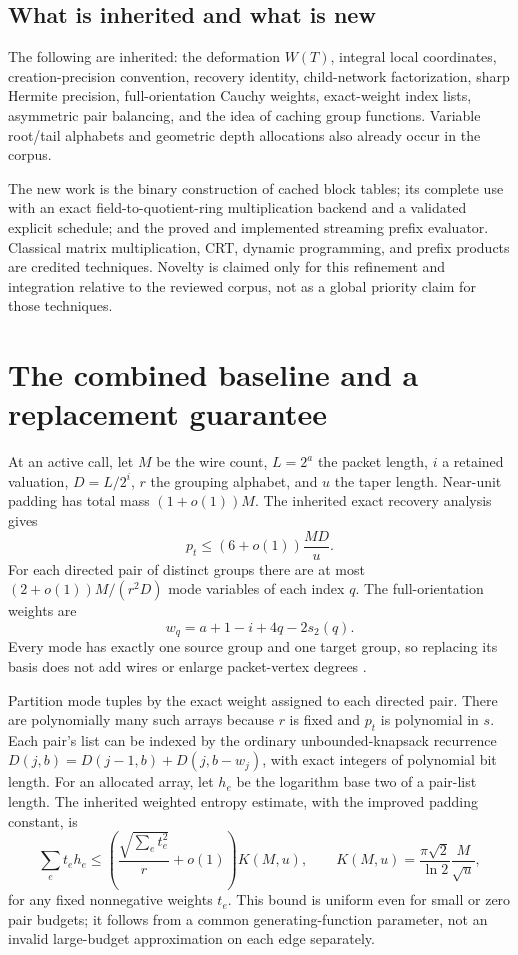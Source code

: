 \documentclass[11pt,letterpaper]{article}
\theoremstyle{definition}\newtheorem{definition}[theorem]{Definition}
\theoremstyle{remark}\newtheorem{remark}[theorem]{Remark}
\begin{document}
\subsection{What is inherited and what is new}
The following are inherited: the deformation $W(T)$, integral local coordinates,
creation-precision convention, recovery identity, child-network factorization, sharp
Hermite precision, full-orientation Cauchy weights, exact-weight index lists, asymmetric
pair balancing, and the idea of caching group functions. Variable root/tail alphabets
and geometric depth allocations also already occur in the corpus.

The new work is the binary construction of cached block tables; its complete use with
an exact field-to-quotient-ring multiplication backend and a validated explicit schedule;
and the proved and implemented streaming prefix evaluator. Classical matrix multiplication,
CRT, dynamic programming, and prefix products are credited techniques. Novelty is claimed
only for this refinement and integration relative to the reviewed corpus, not as a global
priority claim for those techniques.

\section{The combined baseline and a replacement guarantee}
\label{sec:baseline}
At an active call, let $M$ be the wire count, $L=2^a$ the packet length, $i$ a retained
valuation, $D=L/2^i$, $r$ the grouping alphabet, and $u$ the taper length.
Near-unit padding has total mass $(1+o(1))M$. The inherited exact recovery analysis gives
\[
 p_t\le (6+o(1))\frac{MD}{u}.
\]
For each directed pair of distinct groups there are at most
$(2+o(1))M/(r^2D)$ mode variables of each index $q$. The full-orientation weights are
\[
 w_q=a+1-i+4q-2s_2(q).
\]
Every mode has exactly one source group and one target group, so replacing its basis
does not add wires or enlarge packet-vertex degrees \cite{joint}.

Partition mode tuples by the exact weight assigned to each directed pair. There are
polynomially many such arrays because $r$ is fixed and $p_t$ is polynomial in $s$.
Each pair's list can be indexed by the ordinary unbounded-knapsack recurrence
$D(j,b)=D(j-1,b)+D(j,b-w_j)$, with exact integers of polynomial bit length.
For an allocated array, let $h_e$ be the logarithm base two of a pair-list length.
The inherited weighted entropy estimate, with the improved padding constant, is
\begin{equation}\label{eq:weighted}
 \sum_e t_e h_e\le\left(\frac{\sqrt{\sum_e t_e^2}}r+o(1)\right)K(M,u),
 \qquad K(M,u)=\frac{\pi\sqrt2}{\ln2}\frac{M}{\sqrt u},
\end{equation}
for any fixed nonnegative weights $t_e$. This bound is uniform even for small or zero
pair budgets; it follows from a common generating-function parameter, not an invalid
large-budget approximation on each edge separately.
\end{document}
